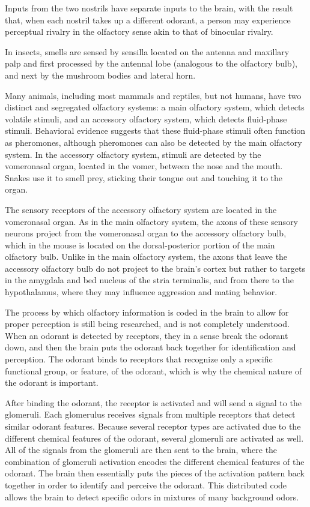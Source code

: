 \documentclass[]{book}
\begin{document}
Inputs from the two nostrils have separate inputs to the brain, with the result that, when each nostril takes up a different odorant, a person may experience perceptual rivalry in the olfactory sense akin to that of binocular rivalry.

In insects, smells are sensed by sensilla located on the antenna and maxillary palp and first processed by the antennal lobe (analogous to the olfactory bulb), and next by the mushroom bodies and lateral horn.

Many animals, including most mammals and reptiles, but not humans, have two distinct and segregated olfactory systems: a main olfactory system, which detects volatile stimuli, and an accessory olfactory system, which detects fluid-phase stimuli. Behavioral evidence suggests that these fluid-phase stimuli often function as pheromones, although pheromones can also be detected by the main olfactory system. In the accessory olfactory system, stimuli are detected by the vomeronasal organ, located in the vomer, between the nose and the mouth. Snakes use it to smell prey, sticking their tongue out and touching it to the organ.

The sensory receptors of the accessory olfactory system are located in the vomeronasal organ. As in the main olfactory system, the axons of these sensory neurons project from the vomeronasal organ to the accessory olfactory bulb, which in the mouse is located on the dorsal-posterior portion of the main olfactory bulb. Unlike in the main olfactory system, the axons that leave the accessory olfactory bulb do not project to the brain's cortex but rather to targets in the amygdala and bed nucleus of the stria terminalis, and from there to the hypothalamus, where they may influence aggression and mating behavior.

The process by which olfactory information is coded in the brain to allow for proper perception is still being researched, and is not completely understood. When an odorant is detected by receptors, they in a sense break the odorant down, and then the brain puts the odorant back together for identification and perception. The odorant binds to receptors that recognize only a specific functional group, or feature, of the odorant, which is why the chemical nature of the odorant is important.

After binding the odorant, the receptor is activated and will send a signal to the glomeruli. Each glomerulus receives signals from multiple receptors that detect similar odorant features. Because several receptor types are activated due to the different chemical features of the odorant, several glomeruli are activated as well. All of the signals from the glomeruli are then sent to the brain, where the combination of glomeruli activation encodes the different chemical features of the odorant. The brain then essentially puts the pieces of the activation pattern back together in order to identify and perceive the odorant. This distributed code allows the brain to detect specific odors in mixtures of many background odors.
\end{document}
